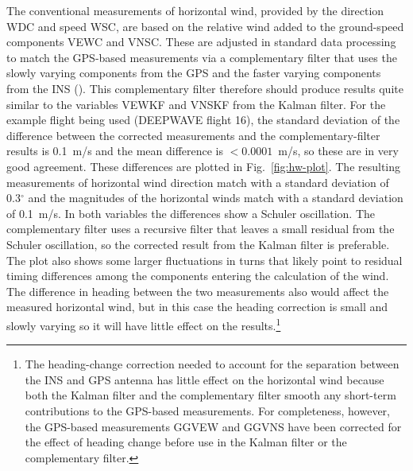 \documentclass[12pt,twoside,english,12pt,twoside,english]{article}\usepackage[]{graphicx}\usepackage[]{color}
\let\OrgIndex\index
\renewcommand*{\index}[1]{\OrgIndex{#1}}
\begin{document}
The conventional measurements
of horizontal wind, provided by the direction WDC
and speed WSC, are based
on the relative wind added to the ground-speed
components VEWC
and VNSC.
These are adjusted in standard data processing to match the GPS-based
measurements via a complementary filter
that uses the slowly varying components from the GPS and the faster
varying components from the INS (\citet{Cooper2016ncartn}). This
complementary filter therefore should produce results quite similar
to the variables VEWKF
and VNSKF
from the Kalman filter. For the example flight being used (DEEPWAVE
flight 16), the standard deviation
of the difference between the corrected measurements and the complementary-filter
results is 0.1~m/s and the mean difference is $<0.0001$~m/s, so
these are in very good agreement. These differences are plotted in
Fig.~\ref{fig:hw-plot}. The resulting measurements of horizontal
wind direction match with a standard deviation of 0.3$^{\circ}$ and
the magnitudes of the horizontal winds match with a standard deviation
of 0.1~m/s. In both variables the differences show a Schuler oscillation.
 The complementary
filter uses a recursive filter that leaves a small residual from the
Schuler oscillation, so the corrected result from the Kalman filter
is preferable. The plot also shows some larger fluctuations in turns
that likely point to residual timing differences among the components
entering the calculation of the wind. The difference in heading between
the two measurements also would affect the measured horizontal wind,
but in this case the heading correction is small and slowly varying
so it will have little effect on the results.\footnote{The heading-change correction needed to account for the separation
between the INS and
GPS antenna has little
effect on the horizontal wind because both the Kalman filter and the
complementary filter smooth any short-term contributions to the GPS-based
measurements. For completeness, however, the GPS-based
measurements GGVEW
and GGVNS have been
corrected for the effect of heading change before use in the Kalman
filter or the complementary filter.} 
\end{document}
